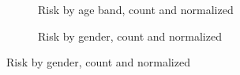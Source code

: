 \documentclass{article}
\begin{document}
\begin{figure}[h]
\begin{subfigure}{.45\textwidth}
		\caption{Risk by age band, count and normalized}
		\label{fig:risk_by_age_nowd}
	\end{subfigure}
	\begin{subfigure}{.45\textwidth}
		\centering
		\caption{Risk by gender, count and normalized}
		\label{fig:risk_by_gender_nowd}
	\end{subfigure}


\end{figure}
\end{document}
